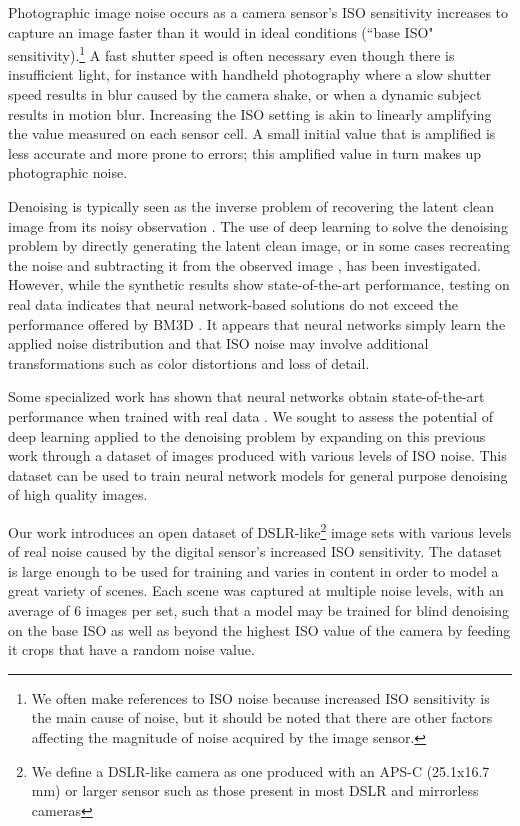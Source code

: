 \documentclass[10pt,twocolumn,letterpaper]{article}
\begin{document}
Photographic image noise occurs as a camera sensor's ISO sensitivity increases to capture an image faster than it would in ideal conditions (``base ISO" sensitivity).\footnote{We often make references to ISO noise because increased ISO sensitivity is the main cause of noise, but it should be noted that there are other factors affecting the magnitude of noise acquired by the image sensor.} A fast shutter speed is often necessary even though there is insufficient light, for instance with handheld photography where a slow shutter speed results in blur caused by the camera shake, or when a dynamic subject results in motion blur. Increasing the ISO setting is akin to linearly amplifying the value measured on each sensor cell. A small initial value that is amplified is less accurate and more prone to errors; this amplified value in turn makes up photographic noise. 

Denoising is typically seen as the inverse problem of recovering the latent clean image from its noisy observation \cite{rednet}. The use of deep learning to solve the denoising problem by directly generating the latent clean image, or in some cases recreating the noise and subtracting it from the observed image \cite{dncnn}, has been investigated. However, while the synthetic results show state-of-the-art performance, testing on real data indicates that neural network-based solutions do not exceed the performance offered by BM3D \cite{darmstadt}. It appears that neural networks simply learn the applied noise distribution and that ISO noise may involve additional transformations such as color distortions and loss of detail.

Some specialized work has shown that neural networks obtain state-of-the-art performance when trained with real data \cite{learningtoseeinthedark}\cite{microscopynoise}. We sought to assess the potential of deep learning applied to the denoising problem by expanding on this previous work through a dataset of images produced with various levels of ISO noise. This dataset can be used to train neural network models for general purpose denoising of high quality images.

Our work introduces an open dataset of DSLR-like\footnote{We define a DSLR-like camera as one produced with an APS-C (25.1x16.7 mm) or larger sensor such as those present in most DSLR and mirrorless cameras} image sets with various levels of real noise caused by the digital sensor's increased ISO sensitivity. The dataset is large enough to be used for training and varies in content in order to model a great variety of scenes. Each scene was captured at multiple noise levels, with an average of 6 images per set, such that a model may be trained for blind denoising on the base ISO as well as beyond the highest ISO value of the camera by feeding it crops that have a random noise value.
\end{document}
